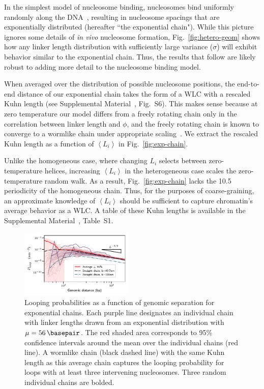 \documentclass[%
 reprint,
superscriptaddress,
showpacs,preprintnumbers,
 amsmath,amssymb,
 aps,
 prl,
floatfix,
]{revtex4-1}
\newcommand{\meanli}{\left\langle{}L_i\right\rangle}
\begin{document}
In the simplest model of nucleosome binding, nucleosomes bind uniformly randomly along the DNA~\cite{beshnova2014}, resulting in nucleosome spacings that are exponentially distributed (hereafter ``the exponential chain").
While this picture ignores some details of \textit{in vivo} nucleosome formation, Fig.~\ref{fig:hetero-geom} shows how any linker length distribution with sufficiently large variance ($\sigma$) will exhibit behavior similar to the exponential chain.
Thus, the results that follow are likely robust to adding more detail to the nucleosome binding model.

When averaged over the distribution of possible nucleosome
    positions, the end-to-end distance of our exponential chain takes the form of a WLC with a rescaled Kuhn length (see Supplemental Material~\cite{supplemental},
    Fig.~S6).
This makes sense because at zero temperature our model differs from a freely rotating chain only in the correlation between linker length and $\phi$, and the freely rotating chain is known to converge to a wormlike chain under
    appropriate scaling~\cite{kilanowski2017}.
We extract the rescaled Kuhn length as a function of $\meanli$ in
    Fig.~\ref{fig:exp-chain}.

Unlike the homogeneous case, where changing $L_i$ selects between zero-temperature helices,
    increasing $\meanli$ in the heterogeneous case scales the zero-temperature random walk.
As a result, Fig.~\ref{fig:exp-chain} lacks
    the \SI{10.5}{\basepair} periodicity of the homogeneous chain.
Thus, for the purposes of coarse-graining, an approximate knowledge of $\meanli$ should be sufficient to capture chromatin's average behavior as a WLC.
A table of these Kuhn lengths is available in the Supplemental Material~\cite{supplemental}, Table~S1.

\begin{figure}[t]
    \centering
    \includegraphics[width=0.48\textwidth]{fig5.pdf}%
    \caption{Looping probabilities as a function of genomic separation for exponential chains. Each purple line designates an individual chain with linker lengths drawn from an exponential distribution with $\mu = \SI{56}{\basepair}$. The red shaded area corresponds to 95\% confidence intervals around the mean over the individual chains (red line). A wormlike chain
    (black dashed line) with the same Kuhn length as this average chain captures the
    looping probability for loops with at least three intervening nucleosomes. Three
    random individual chains are bolded.\label{fig:looping}}
\end{figure}
\end{document}
